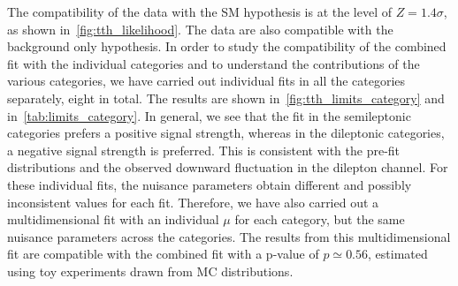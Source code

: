 The compatibility of the data with the SM hypothesis is at the level of $Z=1.4\sigma$, as shown in~\cref{fig:tth_likelihood}. The data are also compatible with the background only hypothesis. In order to study the compatibility of the combined fit with the individual categories and to understand the contributions of the various categories, we have carried out individual fits in all the categories separately, eight in total. The results are shown in~\cref{fig:tth_limits_category} and in~\cref{tab:limits_category}. In general, we see that the fit in the semileptonic categories prefers a positive signal strength, whereas in the dileptonic categories, a negative signal strength is preferred. This is consistent with the pre-fit distributions and the observed downward fluctuation in the dilepton channel. For these individual fits, the nuisance parameters obtain different and possibly inconsistent values for each fit. Therefore, we have also carried out a multidimensional fit with an individual $\mu$ for each category, but the same nuisance parameters across the categories. The results from this multidimensional fit are compatible with the combined fit with a p-value of $p\simeq0.56$, estimated using toy experiments drawn from MC distributions.


